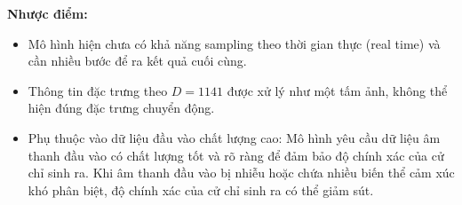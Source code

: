 \textbf{Nhược điểm:}

\begin{itemize}
	\item Mô hình hiện chưa có khả năng sampling theo thời gian thực (real time) và cần nhiều bước để ra kết quả cuối cùng.
	
	\item Thông tin đặc trưng theo $D=1141$ được xử lý như một tấm ảnh, không thể hiện đúng đặc trưng chuyển động.
	
	\item Phụ thuộc vào dữ liệu đầu vào chất lượng cao: Mô hình yêu cầu dữ liệu âm thanh đầu vào có chất lượng tốt và rõ ràng để đảm bảo độ chính xác của cử chỉ sinh ra. Khi âm thanh đầu vào bị nhiễu hoặc chứa nhiều biến thể cảm xúc khó phân biệt, độ chính xác của cử chỉ sinh ra có thể giảm sút.
	
	
	
	
\end{itemize}


%
%

